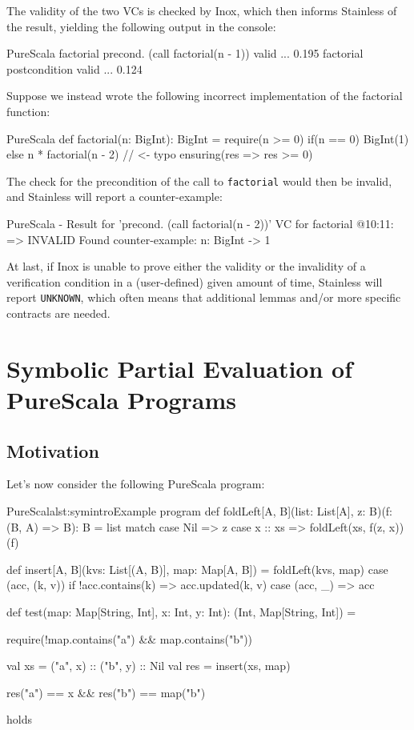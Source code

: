 \documentclass[a4paper,twoside]{article}
\newcommand{\stt}[1]{\texttt{\small{#1}}}
\begin{document}
The validity of the two VCs is checked by Inox, which then informs Stainless of the result, yielding the following output in the console:

\begin{ShortCode}{PureScala}
factorial    precond. (call factorial(n - 1))    valid    ...    0.195
factorial    postcondition                       valid    ...    0.124  
\end{ShortCode}

Suppose we instead wrote the following incorrect implementation of the factorial function:

\begin{ShortCode}{PureScala}
def factorial(n: BigInt): BigInt = {
  require(n >= 0)
  if(n == 0) {
    BigInt(1)
  } else {
    n * factorial(n - 2) // <- typo
  }
} ensuring(res => res >= 0)
\end{ShortCode}

The check for the precondition of the call to \stt{factorial} would then be invalid, and Stainless will report a counter-example:

\begin{ShortCode}{PureScala}
- Result for 'precond. (call factorial(n - 2))' VC for factorial @10:11:
    => INVALID
  Found counter-example:
    n: BigInt -> 1
\end{ShortCode}

At last, if Inox is unable to prove either the validity or the invalidity of a verification condition in a (user-defined) given amount of time, Stainless will report \stt{UNKNOWN}, which often means that additional lemmas and/or more specific contracts are needed.

\clearpage
\section{Symbolic Partial Evaluation of PureScala Programs}
\label{symbolic}

\subsection{Motivation}
\label{symbolic-motivation}

Let's now consider the following PureScala program:

\begin{Code}{PureScala}{lst:symintro}{Example program}
def foldLeft[A, B](list: List[A], z: B)(f: (B, A) => B): B = list match {
  case Nil     => z
  case x :: xs => foldLeft(xs, f(z, x))(f)
}

def insert[A, B](kvs: List[(A, B)], map: Map[A, B]) = {
  foldLeft(kvs, map) {
    case (acc, (k, v)) if !acc.contains(k) => acc.updated(k, v)
    case (acc, _)                          => acc
  }
}

def test(map: Map[String, Int], x: Int, y: Int): (Int, Map[String, Int]) = {
  require(!map.contains("a") && map.contains("b"))

  val xs  = ("a", x) :: ("b", y) :: Nil
  val res = insert(xs, map)

  res("a") == x && res("b") == map("b")
} holds
\end{Code}
\end{document}

